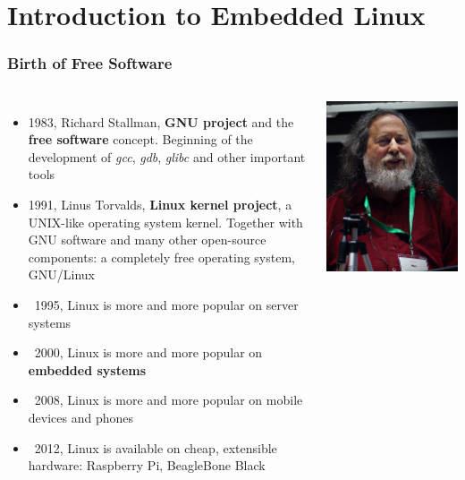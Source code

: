 \section{Introduction to Embedded Linux}

\begin{frame}
  \frametitle{Birth of Free Software}
  \begin{columns}
      \begin{itemize}
      \item 1983, Richard Stallman, {\bf GNU project} and the {\bf free
          software} concept.  Beginning of the development of {\em gcc},
        {\em gdb}, {\em glibc} and other important tools
      \item 1991, Linus Torvalds, {\bf Linux kernel project}, a UNIX-like
        operating system kernel. Together with GNU software and many other
        open-source components: a completely free operating system,
        GNU/Linux
      \item ~1995, Linux is more and more popular on server systems
      \item ~2000, Linux is more and more popular on {\bf embedded
          systems}
      \item ~2008, Linux is more and more popular on mobile devices and phones
      \item ~2012, Linux is available on cheap, extensible hardware:
            Raspberry Pi, BeagleBone Black
      \end{itemize}
      \includegraphics[width=\textwidth]{slides/sysdev-intro/richard-stallman.jpg}

\end{columns}
\end{frame}
